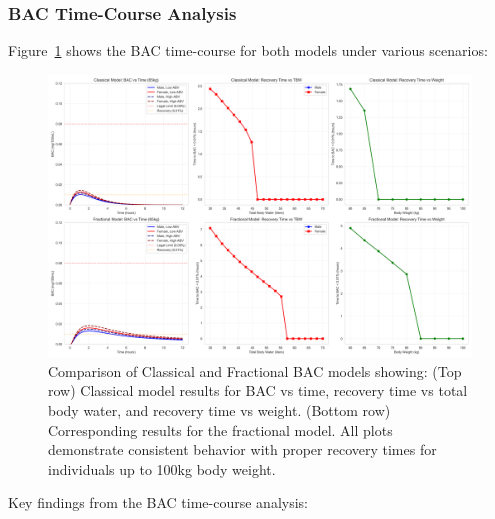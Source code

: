 \documentclass[11pt]{article}
\begin{document}
\subsubsection{BAC Time-Course Analysis}

Figure~\ref{fig:bac_comparison} shows the BAC time-course for both models under various scenarios:

\begin{figure}[H]
    \centering
    \includegraphics[width=\textwidth]{bac_comparison.png}
    \caption{Comparison of Classical and Fractional BAC models showing: (Top row) Classical model results for BAC vs time, recovery time vs total body water, and recovery time vs weight. (Bottom row) Corresponding results for the fractional model. All plots demonstrate consistent behavior with proper recovery times for individuals up to 100kg body weight.}
    \label{fig:bac_comparison}
\end{figure}

Key findings from the BAC time-course analysis:
\end{document}

